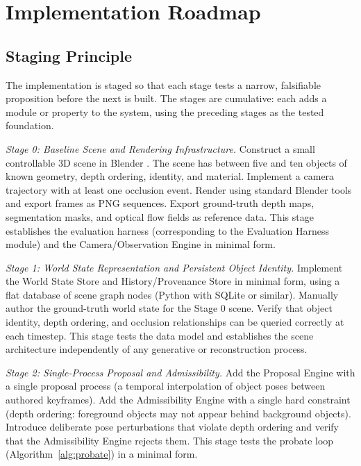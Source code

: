 \documentclass[12pt,a4paper]{article}
\theoremstyle{plain}
\theoremstyle{definition}
\theoremstyle{remark}
\begin{document}
\section{Implementation Roadmap}
\label{sec:implementation}

\subsection{Staging Principle}

The implementation is staged so that each stage tests a narrow, falsifiable proposition before the next is built. The stages are cumulative: each adds a module or property to the system, using the preceding stages as the tested foundation.

\textit{Stage 0: Baseline Scene and Rendering Infrastructure.} Construct a small controllable 3D scene in Blender \cite{blender2024}. The scene has between five and ten objects of known geometry, depth ordering, identity, and material. Implement a camera trajectory with at least one occlusion event. Render using standard Blender tools and export frames as PNG sequences. Export ground-truth depth maps, segmentation masks, and optical flow fields as reference data. This stage establishes the evaluation harness (corresponding to the Evaluation Harness module) and the Camera/Observation Engine in minimal form.

\textit{Stage 1: World State Representation and Persistent Object Identity.} Implement the World State Store and History/Provenance Store in minimal form, using a flat database of scene graph nodes (Python with SQLite or similar). Manually author the ground-truth world state for the Stage 0 scene. Verify that object identity, depth ordering, and occlusion relationships can be queried correctly at each timestep. This stage tests the data model and establishes the scene architecture independently of any generative or reconstruction process.

\textit{Stage 2: Single-Process Proposal and Admissibility.} Add the Proposal Engine with a single proposal process (a temporal interpolation of object poses between authored keyframes). Add the Admissibility Engine with a single hard constraint (depth ordering: foreground objects may not appear behind background objects). Introduce deliberate pose perturbations that violate depth ordering and verify that the Admissibility Engine rejects them. This stage tests the probate loop (Algorithm~\ref{alg:probate}) in a minimal form.
\end{document}
